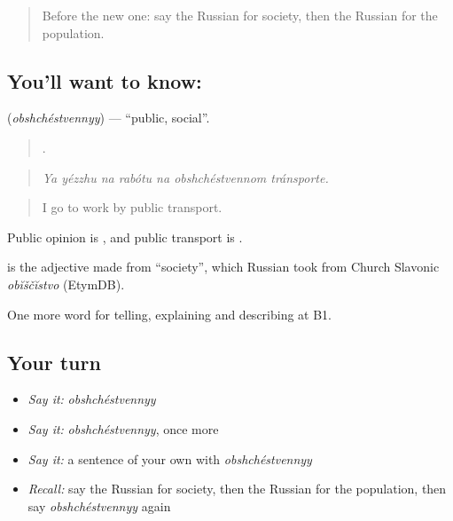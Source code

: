 \label{lesson:RU-C364-obshchestvennyy}



\begin{quote}
Before the new one: say the Russian for society, then the Russian for the population.
\end{quote}

\subsection*{You'll want to know: }
\textbf{} (\emph{obshchéstvennyy}) — \textquotedblleft{}public, social\textquotedblright{}.

\begin{quote}
      .
\end{quote}

\begin{quote}
\emph{Ya yézzhu na rabótu na obshchéstvennom tránsporte.}
\end{quote}

\begin{quote}
I go to work by public transport.
\end{quote}

Public opinion is \emph{ }, and public transport is \emph{ }.

\begin{cousinweb}
\textbf{} is the adjective made from \emph{} \textquotedblleft{}society\textquotedblright{}, which Russian took from Church Slavonic \emph{obĭščĭstvo} (EtymDB).
\end{cousinweb}

\begin{grammarlens}[title={What you've built}]
One more word for telling, explaining and describing at B1.
\end{grammarlens}

\subsection*{Your turn}
\begin{itemize}
\raggedright
  \item \emph{Say it:} \emph{obshchéstvennyy}
  \item \emph{Say it:} \emph{obshchéstvennyy}, once more
  \item \emph{Say it:} a sentence of your own with \emph{obshchéstvennyy}
  \item \emph{Recall:} say the Russian for society, then the Russian for the population, then say \emph{obshchéstvennyy} again
\end{itemize}

